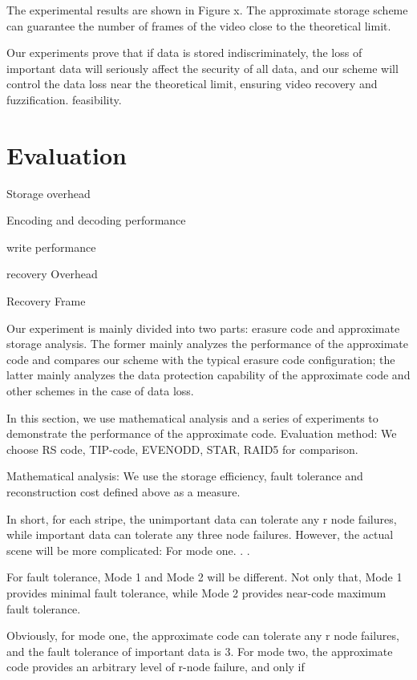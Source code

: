 \documentclass[sigconf]{acmart}
\begin{document}
The experimental results are shown in Figure x. The approximate storage scheme can guarantee the number of frames of the video close to the theoretical limit.


Our experiments prove that if data is stored indiscriminately, the loss of important data will seriously affect the security of all data, and our scheme will control the data loss near the theoretical limit, ensuring video recovery and fuzzification. feasibility.

\section{Evaluation}\label{evaluation}

Storage overhead

Encoding and decoding performance

write performance

recovery Overhead

Recovery Frame


Our experiment is mainly divided into two parts: erasure code and approximate storage analysis. The former mainly analyzes the performance of the approximate code and compares our scheme with the typical erasure code configuration; the latter mainly analyzes the data protection capability of the approximate code and other schemes in the case of data loss.



In this section, we use mathematical analysis and a series of experiments to demonstrate the performance of the approximate code.
Evaluation method: We choose RS code, TIP-code, EVENODD, STAR, RAID5 for comparison.

Mathematical analysis: We use the storage efficiency, fault tolerance and reconstruction cost defined above as a measure.

In short, for each stripe, the unimportant data can tolerate any r node failures, while important data can tolerate any three node failures. However, the actual scene will be more complicated:
For mode one. . .


For fault tolerance, Mode 1 and Mode 2 will be different. Not only that, Mode 1 provides minimal fault tolerance, while Mode 2 provides near-code maximum fault tolerance.

Obviously, for mode one, the approximate code can tolerate any r node failures, and the fault tolerance of important data is 3. For mode two, the approximate code provides an arbitrary level of r-node failure, and only if
\end{document}
